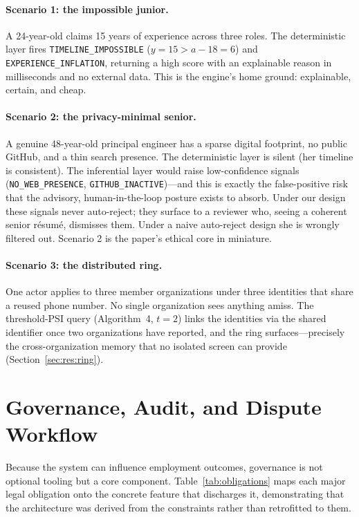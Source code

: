 \documentclass[11pt]{article}
\newcommand{\code}[1]{\texttt{\small #1}}
\begin{document}
\paragraph{Scenario 1: the impossible junior.} A 24-year-old claims 15 years of
experience across three roles. The deterministic layer fires
\code{TIMELINE\_IMPOSSIBLE} ($y=15 > a-18=6$) and \code{EXPERIENCE\_INFLATION},
returning a high score with an explainable reason in milliseconds and no external
data. This is the engine's home ground: explainable, certain, and cheap.

\paragraph{Scenario 2: the privacy-minimal senior.} A genuine 48-year-old
principal engineer has a sparse digital footprint, no public GitHub, and a thin
search presence. The deterministic layer is silent (her timeline is consistent).
The inferential layer would raise low-confidence signals (\code{NO\_WEB\_PRESENCE},
\code{GITHUB\_INACTIVE})---and this is exactly the false-positive risk that the
advisory, human-in-the-loop posture exists to absorb. Under our design these
signals never auto-reject; they surface to a reviewer who, seeing a coherent
senior r\'esum\'e, dismisses them. Under a naive auto-reject design she is wrongly
filtered out. Scenario 2 is the paper's ethical core in miniature.

\paragraph{Scenario 3: the distributed ring.} One actor applies to three member
organizations under three identities that share a reused phone number. No single
organization sees anything amiss. The threshold-PSI query
(Algorithm~4, $t=2$) links the identities via the shared identifier once two
organizations have reported, and the ring surfaces---precisely the
cross-organization memory that no isolated screen can provide
(Section~\ref{sec:res:ring}).

\section{Governance, Audit, and Dispute Workflow}\label{sec:governance}
Because the system can influence employment outcomes, governance is not optional
tooling but a core component. Table~\ref{tab:obligations} maps each major legal
obligation onto the concrete feature that discharges it, demonstrating that the
architecture was derived from the constraints rather than retrofitted to them.
\end{document}
